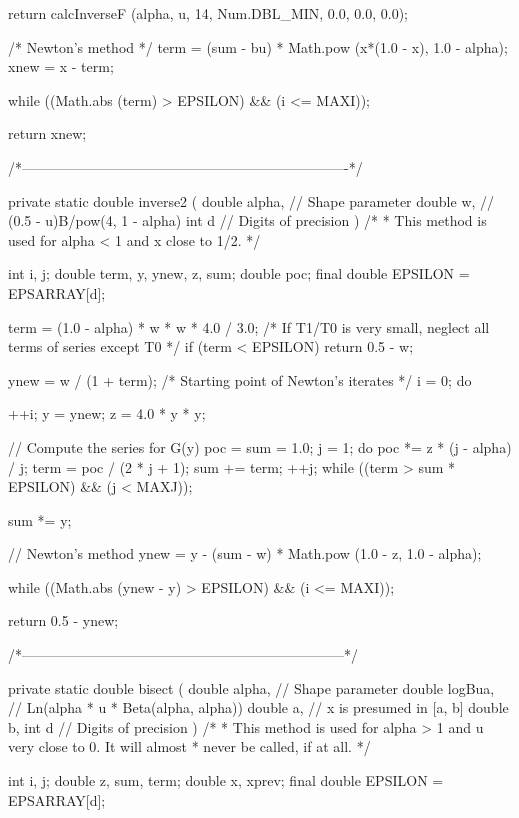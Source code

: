 \begin{code}
\begin{hide} {
      return calcInverseF (alpha, u, 14, Num.DBL_MIN, 0.0, 0.0, 0.0);
   }
{{         /* Newton's method */
         term = (sum - bu) * Math.pow (x*(1.0 - x), 1.0 - alpha);
         xnew = x - term;

      } while ((Math.abs (term) > EPSILON) && (i <= MAXI));

      return xnew;
   }

   /*----------------------------------------------------------------------*/

   private static double inverse2 (
      double alpha,                // Shape parameter
      double w,                    // (0.5 - u)B/pow(4, 1 - alpha)
      int d                        // Digits of precision
      )
   /*
    * This method is used for alpha < 1 and x close to 1/2.
    */
   {
      int i, j;
      double term, y, ynew, z, sum;
      double poc;
      final double EPSILON = EPSARRAY[d];

      term = (1.0 - alpha) * w * w * 4.0 / 3.0;
      /* If T1/T0 is very small, neglect all terms of series except T0 */
      if (term < EPSILON)
         return 0.5 - w;

      ynew = w / (1 + term);     /* Starting point of Newton's iterates */
      i = 0;
      do {
         ++i;
         y = ynew;
         z = 4.0 * y * y;

         // Compute the series for G(y)
         poc = sum = 1.0;
         j = 1;
         do {
            poc *= z * (j - alpha) / j;
            term = poc / (2 * j + 1);
            sum += term;
            ++j;
         } while ((term > sum * EPSILON) && (j < MAXJ));

         sum *= y;

         // Newton's method
         ynew = y - (sum - w) * Math.pow (1.0 - z, 1.0 - alpha);

      } while ((Math.abs (ynew - y) > EPSILON) && (i <= MAXI));

      return 0.5 - ynew;
   }


   /*---------------------------------------------------------------------*/

   private static double bisect (
      double alpha,                // Shape parameter
      double logBua,               // Ln(alpha * u * Beta(alpha, alpha))
      double a,                    // x is presumed in [a, b]
      double b,
      int d                        // Digits of precision
)
   /*
    * This method is used for alpha > 1 and u very close to 0. It will almost
    * never be called, if at all.
    */
   {
      int i, j;
      double z, sum, term;
      double x, xprev;
      final double EPSILON = EPSARRAY[d];

}
\end{hide}
\end{code}
